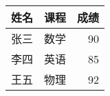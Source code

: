 \documentclass{article}
\begin{document}
\begin{tabular}{|l|c|r|}
  \hline
  姓名 & 课程 & 成绩 \\ \hline
  张三 & 数学 & 90 \\ 
  李四 & 英语 & 85 \\ 
  王五 & 物理 & 92 \\ 
  \hline
\end{tabular}
\end{document}

